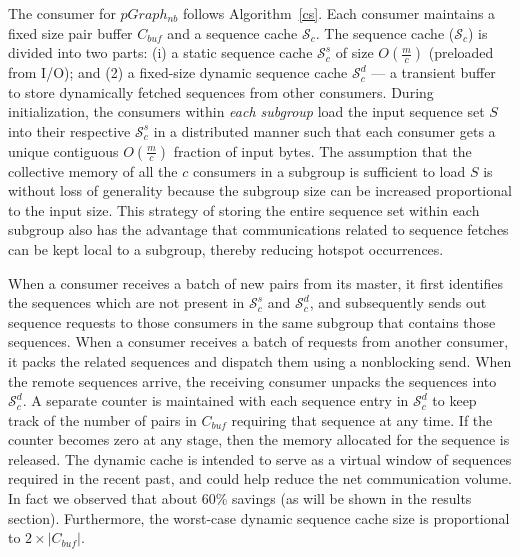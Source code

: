 \documentclass[10pt,journal,letterpaper,compsoc]{IEEEtran}
\begin{document}
The consumer for $pGraph_{nb}$ follows Algorithm~\ref{cs}. Each consumer maintains a fixed size pair buffer $C_{buf}$ and a sequence cache $\mathcal{S}_{c}$. The sequence cache ($\mathcal{S}_{c}$) is divided into two parts: (i) a static sequence cache $\mathcal{S}_{c}^s$ of size $O(\frac{m}{c})$ (preloaded from I/O); and (2) a fixed-size dynamic sequence cache $\mathcal{S}_{c}^d$ --- a transient buffer to store dynamically fetched sequences from other consumers. During initialization, the consumers within \emph{each subgroup} load the input sequence set $S$ into their respective $\mathcal{S}_{c}^s$ in a distributed manner such that each consumer gets a unique contiguous $O(\frac{m}{c})$ fraction of input bytes. The assumption that the collective memory of all the $c$ consumers in a subgroup is sufficient to load $S$ is without loss of generality because the subgroup size can be increased proportional to the input size.  This strategy of storing the entire sequence set within each subgroup also has the advantage that communications related to sequence fetches can be kept local to a subgroup, thereby reducing hotspot occurrences.

When a consumer receives a batch of new pairs from its master, it first identifies the sequences which are not present in $\mathcal{S}_{c}^s$ and $\mathcal{S}_{c}^d$, and subsequently sends out sequence requests to those consumers in the same subgroup that contains those sequences. When a consumer receives a batch of requests from another consumer, it packs the related sequences and dispatch them using a nonblocking send.  When the remote sequences arrive, the receiving consumer unpacks the sequences into $\mathcal{S}_{c}^d$. A separate counter is maintained with each sequence entry in $\mathcal{S}_{c}^d$ to keep track of the number of pairs in $C_{buf}$ requiring that sequence at any time. If the counter becomes zero at any stage, then the memory allocated for the sequence is released. The dynamic cache is intended to serve as a virtual window of sequences required in the recent past, and could help reduce the net communication volume. In fact we observed that about 60\% savings (as will be shown in the results section). Furthermore, the worst-case dynamic sequence cache size is proportional to $2\times |C_{buf}|$.
\end{document}
